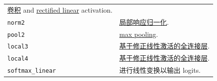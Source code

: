 \begin{longtable}[c]{@{}ll@{}}
\begin{minipage}[t]{0.05\columnwidth}\raggedright\strut
\href{https://github.com/jikexueyuanwiki/tensorflow-zh/blob/master/SOURCE/api_docs/python/nn.md\#conv2d}{卷积}
and
\href{https://github.com/jikexueyuanwiki/tensorflow-zh/blob/master/SOURCE/api_docs/python/nn.md\#relu}{rectified
linear} activation.
\strut\end{minipage}\tabularnewline
\begin{minipage}[t]{0.05\columnwidth}\raggedright\strut
\texttt{norm2}
\strut\end{minipage} &
\begin{minipage}[t]{0.05\columnwidth}\raggedright\strut
\href{https://github.com/jikexueyuanwiki/tensorflow-zh/blob/master/SOURCE/api_docs/python/nn.md\#local_response_normalization}{局部响应归一化}.
\strut\end{minipage}\tabularnewline
\begin{minipage}[t]{0.05\columnwidth}\raggedright\strut
\texttt{pool2}
\strut\end{minipage} &
\begin{minipage}[t]{0.05\columnwidth}\raggedright\strut
\href{https://github.com/jikexueyuanwiki/tensorflow-zh/blob/master/SOURCE/api_docs/python/nn.md\#max_pool}{max
pooling}.
\strut\end{minipage}\tabularnewline
\begin{minipage}[t]{0.05\columnwidth}\raggedright\strut
\texttt{local3}
\strut\end{minipage} &
\begin{minipage}[t]{0.05\columnwidth}\raggedright\strut
\href{https://github.com/jikexueyuanwiki/tensorflow-zh/blob/master/SOURCE/api_docs/python/nn.md}{基于修正线性激活的全连接层}.
\strut\end{minipage}\tabularnewline
\begin{minipage}[t]{0.05\columnwidth}\raggedright\strut
\texttt{local4}
\strut\end{minipage} &
\begin{minipage}[t]{0.05\columnwidth}\raggedright\strut
\href{https://github.com/jikexueyuanwiki/tensorflow-zh/blob/master/SOURCE/api_docs/python/nn.md}{基于修正线性激活的全连接层}.
\strut\end{minipage}\tabularnewline
\begin{minipage}[t]{0.05\columnwidth}\raggedright\strut
\texttt{softmax\_linear}
\strut\end{minipage} &
\begin{minipage}[t]{0.05\columnwidth}\raggedright\strut
进行线性变换以输出 logits.
\strut\end{minipage}\tabularnewline
\bottomrule
\end{longtable}

